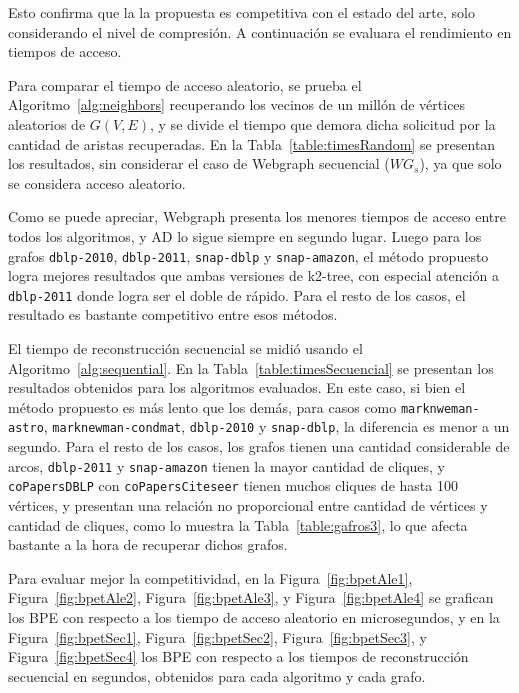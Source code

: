 Esto confirma que la la propuesta es competitiva con el estado del arte, solo considerando el nivel de compresión. A continuación se evaluara el rendimiento en tiempos de acceso.



Para comparar el tiempo de acceso aleatorio, se prueba el Algoritmo~\ref{alg:neighbors} recuperando los vecinos de un millón de vértices aleatorios de $G(V, E)$, y se divide el tiempo que demora dicha solicitud por la cantidad de aristas recuperadas. En la Tabla~\ref{table:timesRandom} se presentan los resultados, sin considerar el caso de Webgraph secuencial ($WG_{s}$), ya que solo se considera acceso aleatorio. 

Como se puede apreciar, Webgraph presenta los menores tiempos de acceso entre todos los algoritmos, y AD lo sigue siempre en segundo lugar. Luego para los grafos \texttt{dblp-2010}, \texttt{dblp-2011}, \texttt{snap-dblp} y \texttt{snap-amazon}, el método propuesto logra mejores resultados que ambas versiones de k2-tree, con especial atención a \texttt{dblp-2011} donde logra ser el doble de rápido. Para el resto de los casos, el resultado es bastante competitivo entre esos métodos.



El tiempo de reconstrucción secuencial se midió usando el Algoritmo~\ref{alg:sequential}. En la Tabla~\ref{table:timesSecuencial} se presentan los resultados obtenidos para los algoritmos evaluados. En este caso, si bien el método propuesto es más lento que los demás, para casos como \texttt{marknweman-astro}, \texttt{marknewman-condmat}, \texttt{dblp-2010} y \texttt{snap-dblp}, la diferencia es menor a un segundo. Para el resto de los casos, los grafos tienen una cantidad considerable de arcos, \texttt{dblp-2011} y \texttt{snap-amazon} tienen la mayor cantidad de cliques, y \texttt{coPapersDBLP} con \texttt{coPapersCiteseer} tienen muchos cliques de hasta 100 vértices, y presentan una relación no proporcional entre cantidad de vértices y cantidad de cliques, como lo muestra la Tabla~\ref{table:gafros3}, lo que afecta bastante a la hora de recuperar dichos grafos.

Para evaluar mejor la competitividad, en la Figura~\ref{fig:bpetAle1}, Figura~\ref{fig:bpetAle2}, Figura~\ref{fig:bpetAle3}, y Figura~\ref{fig:bpetAle4} se grafican los BPE con respecto a los tiempo de acceso aleatorio en microsegundos, y en la Figura~\ref{fig:bpetSec1}, Figura~\ref{fig:bpetSec2}, Figura~\ref{fig:bpetSec3}, y Figura~\ref{fig:bpetSec4} los BPE con respecto a los tiempos de reconstrucción secuencial en segundos, obtenidos para cada algoritmo y cada grafo.

